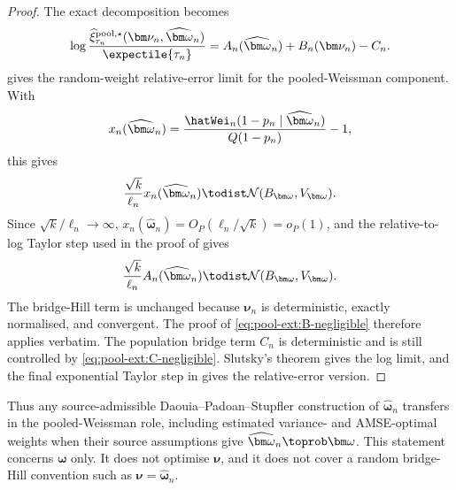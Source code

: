 \begin{proof}
The exact decomposition becomes
\[
  \log
  \frac{
    \widehat\xi_{\tau_n}^{\mathrm{pool},\star}
    (\bm\nu_n,\widehat{\bm\omega}_n)
  }{\expectile{\tau_n}}
  =
  A_n(\widehat{\bm\omega}_n)+B_n(\bm\nu_n)-C_n.
\]
 gives the random-weight
relative-error limit for the pooled-Weissman component. With
\[
  x_n(\widehat{\bm\omega}_n)
  =
  \frac{\hatWei_n(1-p_n\mid\widehat{\bm\omega}_n)}{Q(1-p_n)}-1,
\]
this gives
\[
  \frac{\sqrt{k}}{\ell_n}x_n(\widehat{\bm\omega}_n)
  \todist
  \mathcal N(B_{\bm\omega},V_{\bm\omega}).
\]
Since \(\sqrt{k}/\ell_n\to\infty\),
\(x_n(\widehat{\bm\omega}_n)=O_P(\ell_n/\sqrt{k})=o_P(1)\), and the
relative-to-log Taylor step used in the proof of
 gives
\[
  \frac{\sqrt{k}}{\ell_n}A_n(\widehat{\bm\omega}_n)
  \todist
  \mathcal N(B_{\bm\omega},V_{\bm\omega}).
\]
The bridge-Hill term is unchanged because \(\bm\nu_n\) is deterministic,
exactly normalised, and convergent. The proof of
\eqref{eq:pool-ext:B-negligible} therefore applies verbatim. The population
bridge term \(C_n\) is deterministic and is still
controlled by \eqref{eq:pool-ext:C-negligible}. Slutsky's theorem gives the
log limit, and the final exponential Taylor step in
 gives the relative-error version.
\end{proof}

Thus any source-admissible Daouia--Padoan--Stupfler construction of
\(\widehat{\bm\omega}_n\) transfers in the pooled-Weissman role, including
estimated variance- and AMSE-optimal weights when their source assumptions give
\(\widehat{\bm\omega}_n\toprob\bm\omega\). This statement concerns
\(\bm\omega\) only. It does not optimise \(\bm\nu\), and it does not cover a
random bridge-Hill convention such as
\(\bm\nu=\widehat{\bm\omega}_n\).

